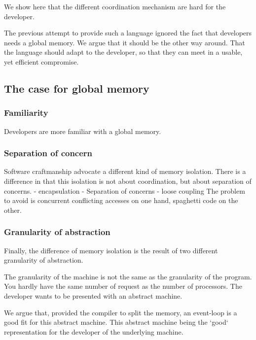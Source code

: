 We show here that the different coordination mechanism are hard for the developer.

The previous attempt to provide such a language ignored the fact that developers needs a global memory. 
We argue that it should be the other way around.
That the language should adapt to the developer, so that they can meet in a usable, yet efficient compromise.


\subsection{The case for global memory}

\subsubsection{Familiarity}

Developers are more familiar with a global memory.

\subsubsection{Separation of concern}

Software craftmanship advocate a different kind of memory isolation.
There is a difference in that this isolation is not about coordination, but about separation of concerns.
- encapsulation
- Separation of concerns
- loose coupling
The problem to avoid is concurrent conflicting accesses on one hand, spaghetti code on the other.

\subsubsection{Granularity of abstraction}

Finally, the difference of memory isolation is the result of two different granularity of abstraction.

The granularity of the machine is not the same as the granularity of the program.
You hardly have the same number of request as the number of processors.
The developer wants to be presented with an abstract machine.

We argue that, provided the compiler to split the memory, an event-loop is a good fit for this abstract machine.
This abstract machine being the `good` representation for the developer of the underlying machine.


